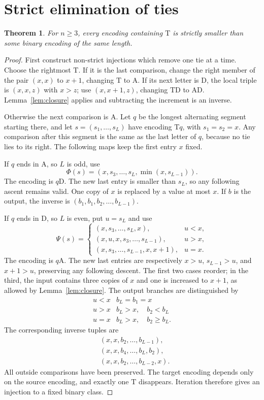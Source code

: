 \documentclass[11pt]{article}
\newtheorem{theorem}{Theorem}[section]
\theoremstyle{definition}
\newcommand{\A}{\mathrm A}
\newcommand{\D}{\mathrm D}
\newcommand{\T}{\mathrm T}
\begin{document}
\section{Strict elimination of ties}\label{sec:ties}
\begin{theorem}\label{thm:ties}
For $n\ge3$, every encoding containing $\T$ is strictly smaller
than some binary encoding of the same length.
\end{theorem}
\begin{proof}
First construct non-strict injections which remove one tie at a time.
Choose the rightmost $\T$. If it is the last comparison, change
the right member of the pair $(x,x)$ to $x+1$, changing $\T$ to $\A$.
If its next letter is $\D$, the local triple is $(x,x,z)$ with
$x>z$; use $(x,x+1,z)$, changing $\T\D$ to $\A\D$.
Lemma~\ref{lem:closure} applies and subtracting the increment is
an inverse.

Otherwise the next comparison is $\A$. Let $q$ be the longest
alternating segment starting there, and let
$s=(s_1,\ldots,s_L)$ have encoding $\T q$, with $s_1=s_2=x$.
Any comparison after this segment is the same as the last letter of $q$,
because no tie lies to its right. The following maps keep the first
entry $x$ fixed.

If $q$ ends in $\A$, so $L$ is odd, use
\[
\Phi(s)=(x,s_3,\ldots,s_L,\min(x,s_{L-1})).
\]
The encoding is $q\D$. The new last entry is smaller than $s_L$,
so any following ascent remains valid. One copy of $x$ is replaced
by a value at most $x$. If $b$ is the output, the inverse is
$(b_1,b_1,b_2,\ldots,b_{L-1})$.

If $q$ ends in $\D$, so $L$ is even, put $u=s_L$ and use
\[
\Psi(s)=
\begin{cases}
(x,s_3,\ldots,s_L,x),&u<x,\\
(x,u,x,s_3,\ldots,s_{L-1}),&u>x,\\
(x,s_3,\ldots,s_{L-1},x,x+1),&u=x.
\end{cases}
\]
The encoding is $q\A$. The new last entries are respectively
$x>u$, $s_{L-1}>u$, and $x+1>u$, preserving any following descent.
The first two cases reorder; in the third, the input contains three
copies of $x$ and one is increased to $x+1$, as allowed by
Lemma~\ref{lem:closure}.
The output branches are distinguished by
\[
\begin{array}{c|c}
u<x& b_L=b_1=x\\
u>x& b_L>x,\quad b_2<b_L\\
u=x& b_L>x,\quad b_2\ge b_L .
\end{array}
\]
The corresponding inverse tuples are
\[
\begin{aligned}
&(x,x,b_2,\ldots,b_{L-1}),\\
&(x,x,b_4,\ldots,b_L,b_2),\\
&(x,x,b_2,\ldots,b_{L-2},x).
\end{aligned}
\]
All outside comparisons have been preserved. The target encoding
depends only on the source encoding, and exactly one $\T$ disappears.
Iteration therefore gives an injection to a fixed binary class.


\end{proof}
\end{document}

